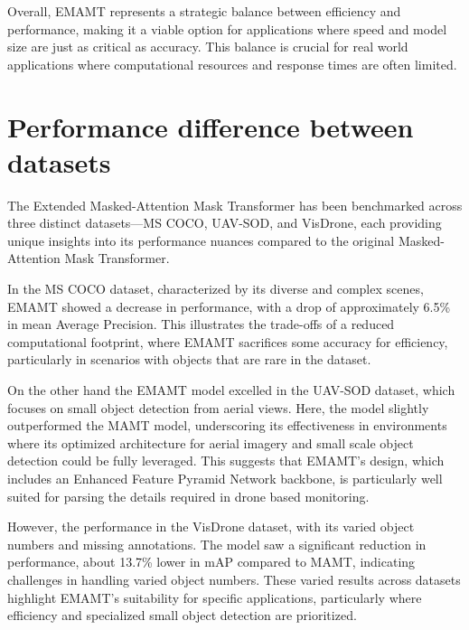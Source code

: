 Overall, EMAMT represents a strategic balance between efficiency and performance, making it a viable option for applications where speed and model size are 
just as critical as accuracy. This balance is crucial for real world applications where computational resources and response times are often limited.


\section{Performance difference between datasets}

The Extended Masked-Attention Mask Transformer has been benchmarked across three distinct datasets—MS COCO, UAV-SOD, and VisDrone, each providing unique 
insights into its performance nuances compared to the original Masked-Attention Mask Transformer.

In the MS COCO dataset, characterized by its diverse and complex scenes, EMAMT showed a decrease in performance, with a drop of approximately 6.5\% in 
mean Average Precision. This illustrates the trade-offs of a reduced computational footprint, where EMAMT sacrifices some accuracy for efficiency, 
particularly in scenarios with objects that are rare in the dataset.

On the other hand the EMAMT model excelled in the UAV-SOD dataset, which focuses on small object detection from aerial views. Here, the model slightly outperformed the 
MAMT model, underscoring its effectiveness in environments where its optimized architecture for aerial imagery and small scale object detection could be fully leveraged. 
This suggests that EMAMT’s design, which includes an Enhanced Feature Pyramid Network backbone, is particularly well suited for parsing the details required 
in drone based monitoring.

However, the performance in the VisDrone dataset, with its varied object numbers and missing annotations. The model saw a significant reduction 
in performance, about 13.7\% lower in mAP compared to MAMT, indicating challenges in handling varied object numbers. These varied results across datasets 
highlight EMAMT's suitability for specific applications, particularly where efficiency and specialized small object detection are prioritized.